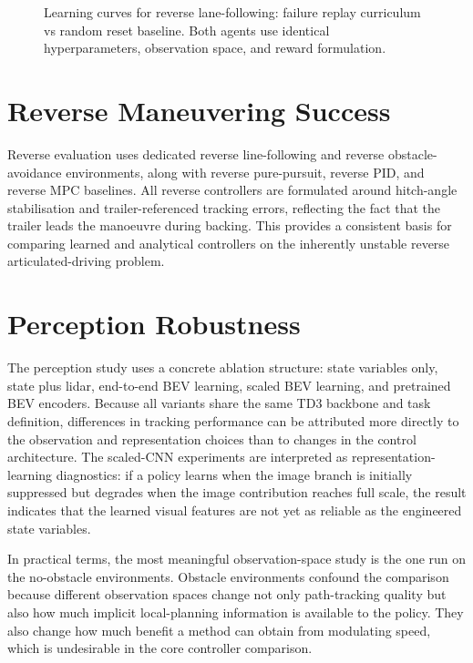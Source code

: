 \begin{figure}[H]
    \centering
    \caption{Learning curves for reverse lane-following: failure replay curriculum vs random
             reset baseline. Both agents use identical hyperparameters, observation space,
             and reward formulation.}
    \label{fig:failure_replay_curve}
\end{figure}



\section{Reverse Maneuvering Success}

Reverse evaluation uses dedicated reverse line-following and reverse obstacle-avoidance environments, along with reverse pure-pursuit, reverse PID, and reverse MPC baselines. All reverse controllers are formulated around hitch-angle stabilisation and trailer-referenced tracking errors, reflecting the fact that the trailer leads the manoeuvre during backing. This provides a consistent basis for comparing learned and analytical controllers on the inherently unstable reverse articulated-driving problem.

\section{Perception Robustness}

The perception study uses a concrete ablation structure: state variables only, state plus lidar, end-to-end BEV learning, scaled BEV learning, and pretrained BEV encoders. Because all variants share the same TD3 backbone and task definition, differences in tracking performance can be attributed more directly to the observation and representation choices than to changes in the control architecture. The scaled-CNN experiments are interpreted as representation-learning diagnostics: if a policy learns when the image branch is initially suppressed but degrades when the image contribution reaches full scale, the result indicates that the learned visual features are not yet as reliable as the engineered state variables.

In practical terms, the most meaningful observation-space study is the one run on the no-obstacle environments. Obstacle environments confound the comparison because different observation spaces change not only path-tracking quality but also how much implicit local-planning information is available to the policy. They also change how much benefit a method can obtain from modulating speed, which is undesirable in the core controller comparison.

